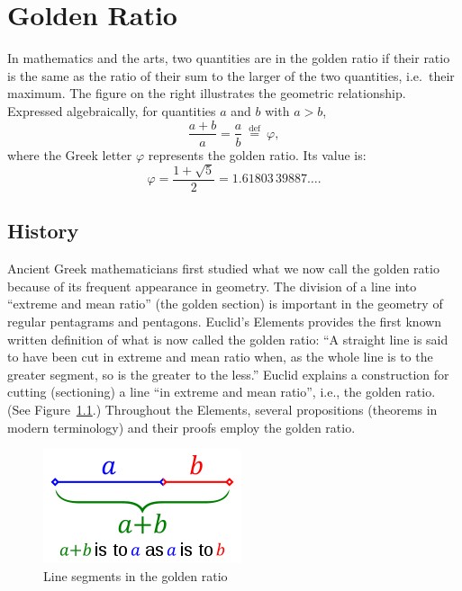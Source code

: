 \chapter{Golden Ratio}

In mathematics and the arts, two quantities are in the golden ratio if their ratio is the same as the ratio of their sum to the larger of the two quantities, i.e.~their maximum. The figure on the right illustrates the geometric relationship. Expressed algebraically, for quantities $a$ and $b$ with $a > b$,
\begin{equation}
 \frac{a+b}{a} = \frac{a}{b} \ \stackrel{\text{def}}{=}\ \varphi,
\end{equation}
where the Greek letter $\varphi$ represents the golden ratio. Its value is:
\begin{equation}
\varphi = \frac{1+\sqrt{5}}{2} = 1.61803\,39887\ldots.
\end{equation}

\section{History}

Ancient Greek mathematicians first studied what we now call the golden ratio because of its frequent appearance in geometry. The division of a line into ``extreme and mean ratio'' (the golden section) is important in the geometry of regular pentagrams and pentagons. Euclid's Elements  provides the first known written definition of what is now called the golden ratio: ``A straight line is said to have been cut in extreme and mean ratio when, as the whole line is to the greater segment, so is the greater to the less.'' Euclid explains a construction for cutting (sectioning) a line ``in extreme and mean ratio'', i.e., the golden ratio. (See Figure~\ref{fig:line:golden}.) Throughout the Elements, several propositions (theorems in modern terminology) and their proofs employ the golden ratio.

\begin{figure}[p!]\centering
\includegraphics[width=.3\textwidth]{220px-Golden-ratio-line}
\caption{Line segments in the golden ratio}
\label{fig:line:golden}
\end{figure}

